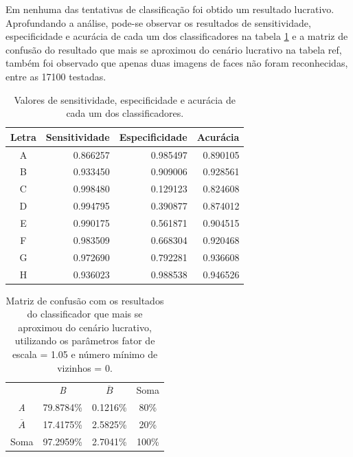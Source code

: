 Em nenhuma das tentativas de classificação foi obtido um resultado lucrativo. Aprofundando a análise, pode-se observar os resultados de sensitividade, especificidade e acurácia de cada um dos classificadores na tabela \ref{tab:results_data} e a matriz de confusão do resultado que mais se aproximou do cenário lucrativo na tabela ref{}, também foi observado que apenas duas imagens de faces não foram reconhecidas, entre as 17100 testadas.

\begin{table}[htbp]
     \caption{Valores de sensitividade, especificidade e acurácia de cada um dos classificadores.}
     \label{tab:results_data}
     \centering
     \begin{tabular}{crrr}
      Letra & Sensitividade & Especificidade & Acurácia \\
      \midrule
           A & 0.866257 & 0.985497 & 0.890105 \\
           B & 0.933450 & 0.909006 & 0.928561 \\
           C & 0.998480 & 0.129123 & 0.824608 \\
           D & 0.994795 & 0.390877 & 0.874012 \\
           E & 0.990175 & 0.561871 & 0.904515 \\
           F & 0.983509 & 0.668304 & 0.920468 \\
           G & 0.972690 & 0.792281 & 0.936608 \\
           H & 0.936023 & 0.988538 & 0.946526 \\
      \end{tabular}
 \end{table}

 \begin{table}[htbp]
     \caption{Matriz de confusão com os resultados do classificador que mais se aproximou do cenário lucrativo, utilizando os parâmetros fator de escala = 1.05 e número mínimo de vizinhos = 0.}
     \label{tab:matriz_de_confusao_best_result}
     \centering
     \begin{tabular}{cccc}\hline\hline
         & \textit{B} & $\overline{B}$ & Soma\\
     \textit{A} & 79.8784\% & 0.1216\% & 80\% \\
     $\overline{A}$ & 17.4175\% & 2.5825\% & 20\% \\
     Soma & 97.2959\% & 2.7041\% & 100\% \\
     \hline\hline
     \end{tabular}
 \end{table}

